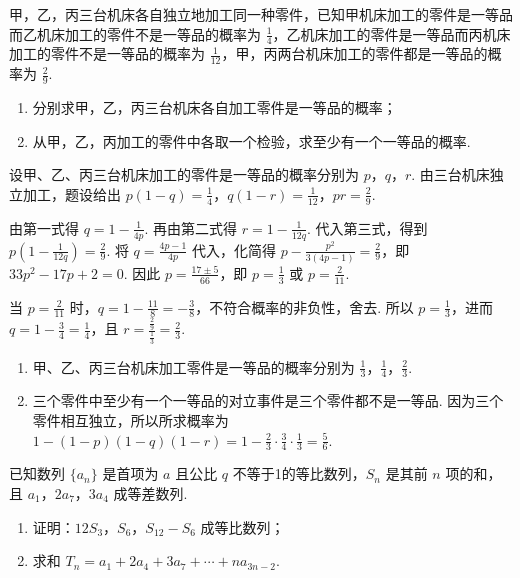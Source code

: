 \begin{problem}
甲，乙，丙三台机床各自独立地加工同一种零件，已知甲机床加工的零件是一等品而乙机床加工的零件不是一等品的概率为 \(\frac{1}{4}\)，乙机床加工的零件是一等品而丙机床加工的零件不是一等品的概率为 \(\frac{1}{12}\)，甲，丙两台机床加工的零件都是一等品的概率为 \(\frac{2}{9}\).

\begin{enumerate}
\item 分别求甲，乙，丙三台机床各自加工零件是一等品的概率；
\item 从甲，乙，丙加工的零件中各取一个检验，求至少有一个一等品的概率.
\end{enumerate}
\end{problem}

\begin{solution}
设甲、乙、丙三台机床加工的零件是一等品的概率分别为 \(p\)，\(q\)，\(r\). 由三台机床独立加工，题设给出
\(p(1-q)=\frac{1}{4}\)，\(q(1-r)=\frac{1}{12}\)，\(pr=\frac{2}{9}\).

由第一式得 \(q=1-\frac{1}{4p}\). 再由第二式得 \(r=1-\frac{1}{12q}\). 代入第三式，得到
\(\displaystyle p\left(1-\frac{1}{12q}\right)=\frac{2}{9}\). 将 \(q=\frac{4p-1}{4p}\) 代入，化简得
\(\displaystyle p-\frac{p^2}{3(4p-1)}=\frac{2}{9}\)，即 \(33p^2-17p+2=0\). 因此
\(p=\frac{17\pm5}{66}\)，即 \(p=\frac{1}{3}\) 或 \(p=\frac{2}{11}\).

当 \(p=\frac{2}{11}\) 时，\(q=1-\frac{11}{8}=-\frac{3}{8}\)，不符合概率的非负性，舍去. 所以 \(p=\frac{1}{3}\)，进而 \(q=1-\frac{3}{4}=\frac{1}{4}\)，且 \(r=\frac{\frac{2}{9}}{\frac{1}{3}}=\frac{2}{3}\).

\begin{enumerate}
\item 甲、乙、丙三台机床加工零件是一等品的概率分别为 \(\frac{1}{3}\)，\(\frac{1}{4}\)，\(\frac{2}{3}\).
\item 三个零件中至少有一个一等品的对立事件是三个零件都不是一等品. 因为三个零件相互独立，所以所求概率为
\(\displaystyle 1-(1-p)(1-q)(1-r)=1-\frac{2}{3}\cdot\frac{3}{4}\cdot\frac{1}{3}=\frac{5}{6}\).
\end{enumerate}
\end{solution}

\begin{problem}
已知数列 \(\{a_{n}\}\) 是首项为 \(a\) 且公比 \(q\) 不等于1的等比数列，\(S_{n}\) 是其前 \(n\) 项的和，且 \(a_{1}\)，\(2a_{7}\)，\(3a_{4}\) 成等差数列.

\begin{enumerate}
\item 证明：\(12S_{3}\)，\(S_{6}\)，\(S_{12}-S_{6}\) 成等比数列；
\item 求和 \(T_{n}=a_{1}+2a_{4}+3a_{7}+\cdots+na_{3n-2}\).
\end{enumerate}
\end{problem}

